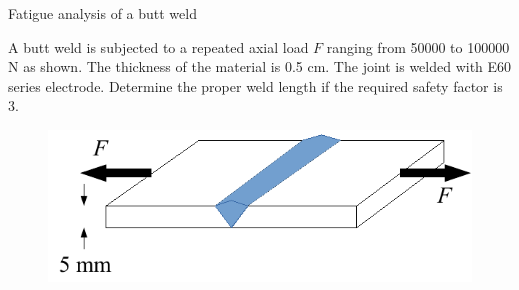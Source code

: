 \documentclass[
10pt,
a4paper,
openany,
svgnames,
]{book}
\begin{document}
\begin{example} Fatigue analysis of a butt weld

  A butt weld is subjected to a repeated axial load $F$ ranging from 50000 to 100000 N as shown. The thickness of the material is 0.5 cm. The joint is welded with E60 series electrode. Determine the proper weld length if the required safety factor is 3.

  \begin{figure}[H]
    \centering
    \includegraphics[scale=0.7]{pictures/Welding/fatigue-weld-analysis-example}
  \end{figure}
\end{example}
\end{document}
